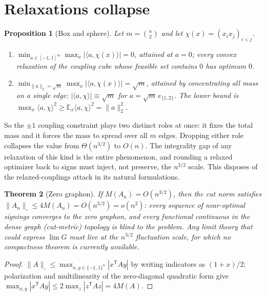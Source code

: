 \documentclass[11pt]{article}
\newtheorem{theorem}{Theorem}[section]
\newtheorem{proposition}[theorem]{Proposition}
\theoremstyle{remark}
\newcommand{\eps}{\{-1,1\}}
\newcommand{\E}{\mathbb E}
\begin{document}
\section{Relaxations collapse}\label{sec:relax}

\begin{proposition}[Box and sphere]\label{prop:relax}
Let $m=\binom n2$ and let $\chi(x)=(x_ix_j)_{i<j}$.
\begin{enumerate}
\item $\displaystyle\min_{a\in[-1,1]^m}\max_x|\langle a,\chi(x)\rangle|=0$,
attained at $a=0$; every convex relaxation of the coupling cube whose
feasible set contains $0$ has optimum $0$.
\item $\displaystyle\min_{\|a\|_2=\sqrt m}\max_x|\langle a,\chi(x)\rangle|
=\sqrt m$, attained by concentrating all mass on a single edge:
$|\langle a,\chi\rangle|\equiv\sqrt m$ for $a=\sqrt m\,e_{\{1,2\}}$.
The lower bound is
$\max_x\langle a,\chi\rangle^2\ge\E_x\langle a,\chi\rangle^2=\|a\|_2^2$.
\end{enumerate}
\end{proposition}

So the $\pm1$ coupling constraint plays two distinct roles at once:
it fixes the total mass and it forces the mass to spread over all
$m$ edges. Dropping either role collapses the value from
$\Theta(n^{3/2})$ to $O(n)$. The integrality gap of any relaxation of
this kind is the entire phenomenon, and rounding a relaxed optimizer
back to signs must inject, not preserve, the $n^{3/2}$ scale. This
disposes of the relaxed-couplings attack in its natural formulations.

\begin{theorem}[Zero graphon]\label{thm:graphon}
If $M(A_n)=O(n^{3/2})$, then the cut norm satisfies
$\|A_n\|_\square\le4M(A_n)=O(n^{3/2})=o(n^2)$: every sequence of
near-optimal signings converges to the zero graphon, and every
functional continuous in the dense graph (cut-metric) topology is
blind to the problem. Any limit theory that could express
$\lim G$ must live at the $n^{3/2}$ fluctuation scale, for which no
compactness theorem is currently available.
\end{theorem}
\begin{proof}
$\|A\|_\square\le\max_{x,y\in\eps^n}|x^{\mathsf T}Ay|$ by writing
indicators as $(1+x)/2$; polarization and multilinearity of the
zero-diagonal quadratic form give
$\max_{x,y}|x^{\mathsf T}Ay|\le2\max_z|z^{\mathsf T}Az|=4M(A)$.
\end{proof}
\end{document}
